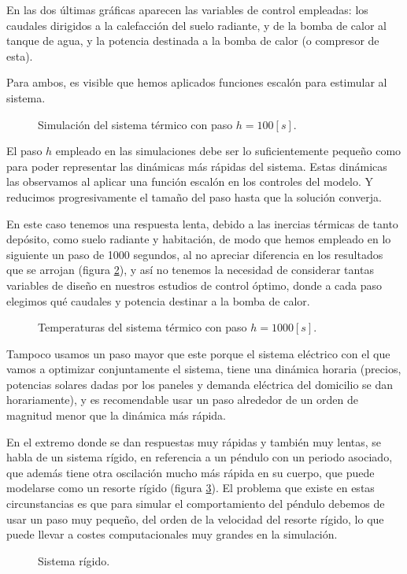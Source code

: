 En las dos últimas gráficas aparecen las variables de control empleadas: los
caudales dirigidos a la calefacción del suelo radiante, y de la bomba de calor
al tanque de agua, y la potencia destinada a la bomba de calor (o compresor de
esta).

Para ambos, es visible que hemos aplicados funciones escalón para estimular al
sistema.

\begin{figure}[h] \centering
	\centering
	
	\caption{Simulación del sistema térmico con paso $h=100[s]$.}
	\label{fig:simulacion_1_h:100s}
\end{figure}


El paso $h$ empleado en las simulaciones debe ser lo suficientemente pequeño
como para poder representar las dinámicas más rápidas del sistema. Estas
dinámicas las observamos al aplicar una función escalón en los controles del
modelo. Y reducimos progresivamente el tamaño del paso hasta que la solución
converja.

En este caso tenemos una respuesta lenta, debido a las inercias térmicas de
tanto depósito, como suelo radiante y habitación, de modo que hemos empleado en
lo siguiente un paso de 1000 segundos, al no apreciar diferencia en los
resultados que se arrojan (figura \ref{fig:simulacion_2_h:1000s}), y así no
tenemos la necesidad de considerar tantas variables de diseño en nuestros
estudios de control óptimo, donde a cada paso elegimos qué caudales y potencia
destinar a la bomba de calor.

\begin{figure}[h] \centering
	\centering
	
	\caption{Temperaturas del sistema térmico con paso $h=1000[s]$.}
	\label{fig:simulacion_2_h:1000s}
\end{figure}

Tampoco usamos un paso mayor que este porque el sistema eléctrico con el que
vamos a optimizar conjuntamente el sistema, tiene una dinámica horaria
(precios, potencias solares dadas por los paneles y demanda eléctrica del
domicilio se dan horariamente), y es recomendable usar un paso alrededor de un orden
de magnitud menor que la dinámica más rápida.

En el extremo donde se dan respuestas muy rápidas y también muy lentas, se
habla de un sistema rígido, en referencia a un péndulo con un periodo
asociado, que además tiene otra oscilación mucho más rápida en su cuerpo,
que puede modelarse como un resorte rígido (figura \ref{fig:stiff_system}). El
problema que existe en estas circunstancias es que para simular el
comportamiento del péndulo debemos de usar un paso muy pequeño, del orden de
la velocidad del resorte rígido, lo que puede llevar a costes computacionales
muy grandes en la simulación.

\begin{figure}[h] \centering
	\centering
	
	\caption{Sistema rígido.}
	\label{fig:stiff_system}
\end{figure}
